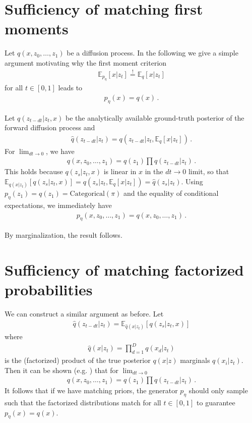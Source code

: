 \clearpage
\section{Sufficiency of matching first moments}
\label{app:sufficiency_first_moments}
Let $q(x, z_0, \dots, z_1)$ be a diffusion process.
In the following we give a simple argument motivating why the first moment criterion
\begin{align}
    \mathbb{E}_{p_\eta}[x|z_t] \stackrel{!}{=} \mathbb{E}_q[x|z_t] \label{eq:exp_eq}
\end{align}
for all $t \in [0, 1]$ leads to
\begin{align}
    p_\eta(x) = q(x)\,.
\end{align}

Let $q(z_{t-dt}|z_t, x)$ be the analytically available ground-truth posterior of the forward diffusion process and
\begin{align}
\hat{q}(z_{t-dt}|z_t) = q(z_{t-dt}|z_t, \mathbb{E}_q[x|z_t])\,.
\end{align}
For $\lim_{dt \to 0}$, we have
\begin{align}
    q(x, z_0, \dots, z_1) = q(z_1) \prod \hat{q}(z_{t-dt}|z_t)\,.
\end{align}
This holds because $q(z_s|z_t, x)$ is linear in $x$ in the $dt \to 0$ limit, so that $\mathbb{E}_{q(x|z_t)}[q(z_s|z_t, x)] = q(z_s|z_t, \mathbb{E}_q[x|z_t]) = \hat{q}(z_s|z_t)$.
Using $p_\eta(z_1) = q(z_1) = \mathrm{Categorical}(\pi)$ and the equality of conditional expectations, we immediately have
\begin{align}
p_\eta(x, z_0, \dots, z_1) = q(x, z_0, \dots, z_1)\,.
\end{align}

By marginalization, the result follows.

\section{Sufficiency of matching factorized probabilities}
\label{app:sufficiency_factorized_probs}
We can construct a similar argument as before.
Let
\begin{align}
    \hat{q}(z_{t-dt}|z_t) = \mathbb{E}_{\hat{q}(x|z_t)}\left[q(z_s|z_t, x) \right]
\end{align}
where
\begin{align}
    \hat{q}(x|z_t) = \prod_{d=1}^D q(x_d|z_t)
\end{align}
is the (factorized) product of the true posterior $q(x|z)$ marginals $q(x_i|z_t)$.
Then it can be shown (e.g. \citet{gat2024discreteflowmatching}) that for $\lim_{dt \to 0}$
\begin{align}
    q(x, z_0, \dots, z_1) = q(z_1) \prod \hat{q}(z_{t-dt}|z_t) \,.
\end{align}
It follows that if we have matching priors, the generator $p_\eta$ should only sample such that the factorized distributions match for all $t \in [0, 1]$ to guarantee $p_\eta(x)=q(x)$.
